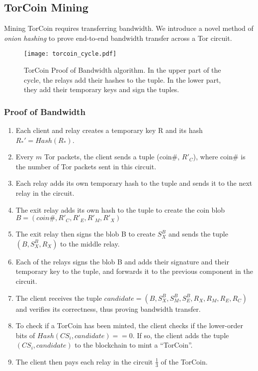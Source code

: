\subsection{TorCoin Mining}

Mining TorCoin requires transferring bandwidth. We introduce a novel method of
\textit{onion hashing} to prove end-to-end bandwidth transfer across a Tor
circuit.

\begin{figure}[H]
  \centering
    \texttt{[image: torcoin\_cycle.pdf]}
  \caption{TorCoin Proof of Bandwidth algorithm. In the upper part of the cycle, the relays add their hashes to the tuple. In the lower part, they add their temporary keys and sign the tuples.}
\end{figure}

\subsubsection{Proof of Bandwidth}
\begin{enumerate}
\item Each client and relay creates a temporary key R and its hash $R_*' = Hash(R_*)$. 
\item Every $m$ Tor packets, the client sends a tuple (coin\#, $R'_C$), where coin\# is the number of Tor packets sent in this circuit.
\item Each relay adds its own temporary hash to the tuple and sends it to the next relay in the circuit.
\item The exit relay adds its own hash to the tuple to create the coin blob 
$B = (coin\#, R'_{C}, R'_{E}, R'_{M}, R'_{X})$ 
\item The exit relay then signs the blob B to create $S^B_X$ and sends the tuple $(B, S^B_X, R_X)$ to the middle relay.
\item Each of the relays signs the blob B and adds their signature and their temporary key to the tuple, and forwards it to the previous component in the circuit. 
\item The client receives the tuple $candidate = (B, S^B_X, S^B_M, S^B_E, R_X, R_M, R_E, R_C)$ and verifies its correctness, thus proving bandwidth transfer.
\item To check if a TorCoin has been minted, the client checks if the lower-order bits of $Hash(CS_i, candidate) == 0$. If so, the client adds the tuple $(CS_i, candidate)$ to the blockchain to mint a ``TorCoin''.
\item The client then pays each relay in the circuit $\frac{1}{3}$ of the TorCoin. 
\end{enumerate}

